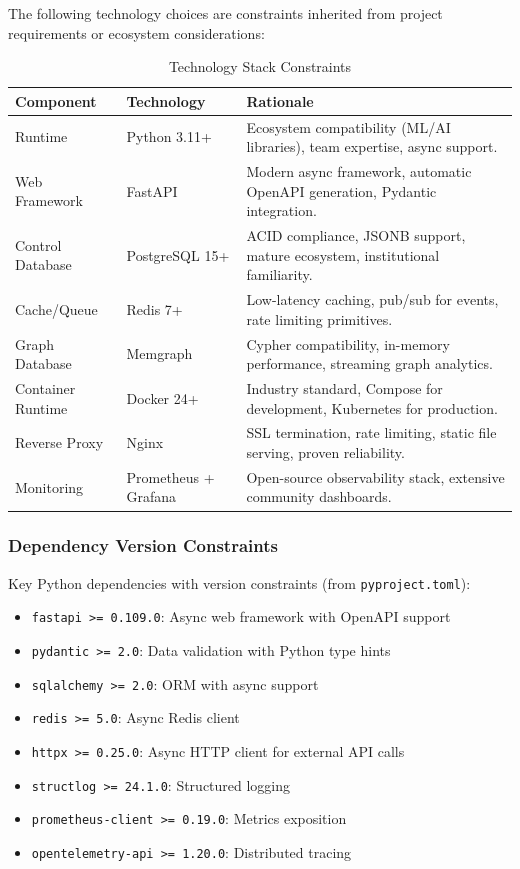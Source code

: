 The following technology choices are constraints inherited from project requirements or ecosystem considerations:

\begin{table}[htbp]
\centering
\caption{Technology Stack Constraints}
\label{tab:technology-constraints}
\small
\begin{tabularx}{\textwidth}{|l|l|X|}
\hline
\textbf{Component} & \textbf{Technology} & \textbf{Rationale} \\
\hline
Runtime & Python 3.11+ & Ecosystem compatibility (ML/AI libraries), team expertise, async support. \\
\hline
Web Framework & FastAPI & Modern async framework, automatic OpenAPI generation, Pydantic integration. \\
\hline
Control Database & PostgreSQL 15+ & ACID compliance, JSONB support, mature ecosystem, institutional familiarity. \\
\hline
Cache/Queue & Redis 7+ & Low-latency caching, pub/sub for events, rate limiting primitives. \\
\hline
Graph Database & Memgraph & Cypher compatibility, in-memory performance, streaming graph analytics. \\
\hline
Container Runtime & Docker 24+ & Industry standard, Compose for development, Kubernetes for production. \\
\hline
Reverse Proxy & Nginx & SSL termination, rate limiting, static file serving, proven reliability. \\
\hline
Monitoring & Prometheus + Grafana & Open-source observability stack, extensive community dashboards. \\
\hline
\end{tabularx}
\end{table}

\subsubsection{Dependency Version Constraints}

Key Python dependencies with version constraints (from \texttt{pyproject.toml}):

\begin{itemize}
    \item \texttt{fastapi >= 0.109.0}: Async web framework with OpenAPI support
    \item \texttt{pydantic >= 2.0}: Data validation with Python type hints
    \item \texttt{sqlalchemy >= 2.0}: ORM with async support
    \item \texttt{redis >= 5.0}: Async Redis client
    \item \texttt{httpx >= 0.25.0}: Async HTTP client for external API calls
    \item \texttt{structlog >= 24.1.0}: Structured logging
    \item \texttt{prometheus-client >= 0.19.0}: Metrics exposition
    \item \texttt{opentelemetry-api >= 1.20.0}: Distributed tracing
\end{itemize}

